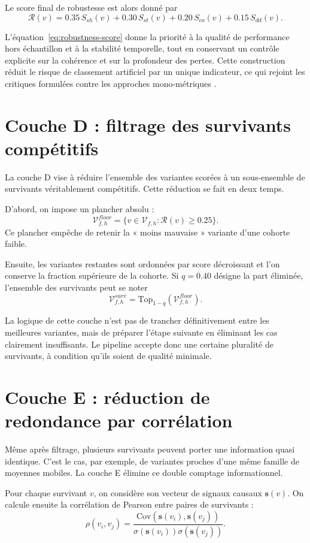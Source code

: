 Le score final de robustesse est alors donné par
\begin{equation}
\mathcal{R}(v)=0.35\,S_{sh}(v)+0.30\,S_{st}(v)+0.20\,S_{co}(v)+0.15\,S_{dd}(v).
\label{eq:robustness-score}
\end{equation}

L'équation~\ref{eq:robustness-score} donne la priorité à la qualité de
performance hors échantillon et à la stabilité temporelle, tout en conservant un
contrôle explicite sur la cohérence et sur la profondeur des pertes. Cette
construction réduit le risque de classement artificiel par un unique indicateur,
ce qui rejoint les critiques formulées contre les approches mono-métriques
\cite{bailey2014}.

\section{Couche D : filtrage des survivants compétitifs}
La couche D vise à réduire l'ensemble des variantes scorées à un sous-ensemble de
survivants véritablement compétitifs. Cette réduction se fait en deux temps.

D'abord, on impose un plancher absolu :
\[
\mathcal{V}^{floor}_{f,h}=\{v\in \mathcal{V}_{f,h} : \mathcal{R}(v)\geq 0.25\}.
\]
Ce plancher empêche de retenir la « moins mauvaise » variante d'une cohorte
faible.

Ensuite, les variantes restantes sont ordonnées par score décroissant et l'on
conserve la fraction supérieure de la cohorte. Si \(q=0.40\) désigne la part
éliminée, l'ensemble des survivants peut se noter
\[
\mathcal{V}^{surv}_{f,h}=\mathrm{Top}_{1-q}(\mathcal{V}^{floor}_{f,h}).
\]

La logique de cette couche n'est pas de trancher définitivement entre les
meilleures variantes, mais de préparer l'étape suivante en éliminant les cas
clairement insuffisants. Le pipeline accepte donc une certaine pluralité de
survivants, à condition qu'ils soient de qualité minimale.

\section{Couche E : réduction de redondance par corrélation}
Même après filtrage, plusieurs survivants peuvent porter une information quasi
identique. C'est le cas, par exemple, de variantes proches d'une même famille de
moyennes mobiles. La couche E élimine ce double comptage informationnel.

Pour chaque survivant \(v\), on considère son vecteur de signaux causaux
\(\mathbf{s}(v)\). On calcule ensuite la corrélation de Pearson entre paires de
survivants :
\begin{equation}
\rho(v_i,v_j)=\frac{\mathrm{Cov}(\mathbf{s}(v_i),\mathbf{s}(v_j))}{\sigma(\mathbf{s}(v_i))\sigma(\mathbf{s}(v_j))}.
\label{eq:pearson-signals}
\end{equation}

